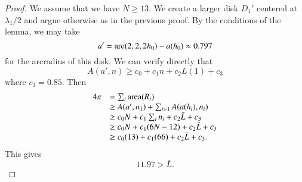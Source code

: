 \begin{proof}  We assume that we have $N\ge 13$. We create a larger disk $D_1'$ centered at $\lambda_1/2$ and argue otherwise as in the previous proof.  
By the conditions of the lemma, we may take 
$$a'=\operatorname{arc}(2,2,2{h_0})-a({h_0}) \approx 0.797$$
for the arcradius of this disk.  We can verify directly that~\cite[cc:alin2]{hales:2009:nonlinear} %
$$A(a',n) \ge c_0 + c_1 n + c_2 L(1) + c_3$$
where $c_3 = 0.85$.
Then 
$$
\begin{array}{lll}
4\pi &= \sum_i{\operatorname{area}}(R_i)\\
     &\ge A(a',n_1)+\sum_{i>1} A(a(h_i),n_i) \\
     &\ge  c_0 N +c_1\sum_i n_i + c_2 \bar L + c_3\\
     &\ge c_0 N +c_1 (6N-12) + c_2 \bar L + c_3\\
     &\ge  c_0 (13) +c_1 (66) + c_2 \bar L + c_3.\\
\end{array}
$$
This gives
$$
11.97 > \bar L. 
$$
\end{proof}


